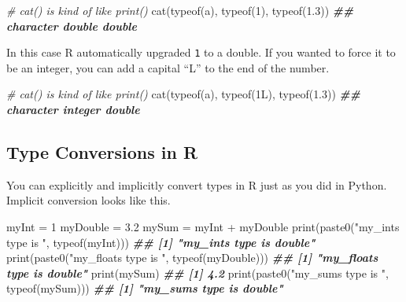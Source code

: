 \documentclass[
  12pt,
  krantz2]{krantz}
\makeatletter
\newenvironment{Shaded}{\begin{snugshade}}{\end{snugshade}}
\newcommand{\CommentTok}[1]{\textcolor[rgb]{0.37,0.37,0.37}{\textit{#1}}}
\newcommand{\DecValTok}[1]{\textcolor[rgb]{0.06,0.06,0.06}{#1}}
\newcommand{\DocumentationTok}[1]{\textcolor[rgb]{0.37,0.37,0.37}{\textbf{\textit{#1}}}}
\newcommand{\FloatTok}[1]{\textcolor[rgb]{0.06,0.06,0.06}{#1}}
\newcommand{\FunctionTok}[1]{\textcolor[rgb]{0,0,0}{#1}}
\newcommand{\NormalTok}[1]{#1}
\newcommand{\OtherTok}[1]{\textcolor[rgb]{0.37,0.37,0.37}{#1}}
\newcommand{\SpecialCharTok}[1]{\textcolor[rgb]{0,0,0}{#1}}
\newcommand{\StringTok}[1]{\textcolor[rgb]{0.5,0.5,0.5}{#1}}
\newenvironment{kframe}{%
\medskip{}
\setlength{\fboxsep}{.8em}
 \def\at@end@of@kframe{}%
 \ifinner\ifhmode%
  \def\at@end@of@kframe{\end{minipage}}%
  \begin{minipage}{\columnwidth}%
 \fi\fi%
 \def\FrameCommand##1{\hskip\@totalleftmargin \hskip-\fboxsep
 \colorbox{shadecolor}{##1}\hskip-\fboxsep
     \hskip-\linewidth \hskip-\@totalleftmargin \hskip\columnwidth}%
 \MakeFramed {\advance\hsize-\width
   \@totalleftmargin\z@ \linewidth\hsize
   \@setminipage}}%
 {\par\unskip\endMakeFramed%
 \at@end@of@kframe}
\renewenvironment{Shaded}{\begin{kframe}}{\end{kframe}}
\makeatother
\begin{document}
\begin{Shaded}
\begin{Highlighting}[]
\CommentTok{\# cat() is kind of like print()}
\FunctionTok{cat}\NormalTok{(}\FunctionTok{typeof}\NormalTok{(}\StringTok{\textquotesingle{}a\textquotesingle{}}\NormalTok{), }\FunctionTok{typeof}\NormalTok{(}\DecValTok{1}\NormalTok{), }\FunctionTok{typeof}\NormalTok{(}\FloatTok{1.3}\NormalTok{))}
\DocumentationTok{\#\# character double double}
\end{Highlighting}
\end{Shaded}

In this case R automatically upgraded \texttt{1} to a double. If you wanted to force it to be an integer, you can add a capital ``L'' to the end of the number.

\begin{Shaded}
\begin{Highlighting}[]
\CommentTok{\# cat() is kind of like print()}
\FunctionTok{cat}\NormalTok{(}\FunctionTok{typeof}\NormalTok{(}\StringTok{\textquotesingle{}a\textquotesingle{}}\NormalTok{), }\FunctionTok{typeof}\NormalTok{(1L), }\FunctionTok{typeof}\NormalTok{(}\FloatTok{1.3}\NormalTok{))}
\DocumentationTok{\#\# character integer double}
\end{Highlighting}
\end{Shaded}

\hypertarget{type-conversions-in-r}{%
\subsection{Type Conversions in R}\label{type-conversions-in-r}}

You can explicitly and implicitly convert types in R just as you did in Python. Implicit conversion looks like this.

\begin{Shaded}
\begin{Highlighting}[]
\NormalTok{myInt }\OtherTok{=} \DecValTok{1}
\NormalTok{myDouble }\OtherTok{=} \FloatTok{3.2}
\NormalTok{mySum }\OtherTok{=}\NormalTok{ myInt }\SpecialCharTok{+}\NormalTok{ myDouble}
\FunctionTok{print}\NormalTok{(}\FunctionTok{paste0}\NormalTok{(}\StringTok{"my\_int\textquotesingle{}s type is "}\NormalTok{, }\FunctionTok{typeof}\NormalTok{(myInt)))}
\DocumentationTok{\#\# [1] "my\_int\textquotesingle{}s type is double"}
\FunctionTok{print}\NormalTok{(}\FunctionTok{paste0}\NormalTok{(}\StringTok{"my\_float\textquotesingle{}s type is "}\NormalTok{, }\FunctionTok{typeof}\NormalTok{(myDouble)))}
\DocumentationTok{\#\# [1] "my\_float\textquotesingle{}s type is double"}
\FunctionTok{print}\NormalTok{(mySum)}
\DocumentationTok{\#\# [1] 4.2}
\FunctionTok{print}\NormalTok{(}\FunctionTok{paste0}\NormalTok{(}\StringTok{"my\_sum\textquotesingle{}s type is "}\NormalTok{, }\FunctionTok{typeof}\NormalTok{(mySum)))}
\DocumentationTok{\#\# [1] "my\_sum\textquotesingle{}s type is double"}
\end{Highlighting}
\end{Shaded}
\end{document}
